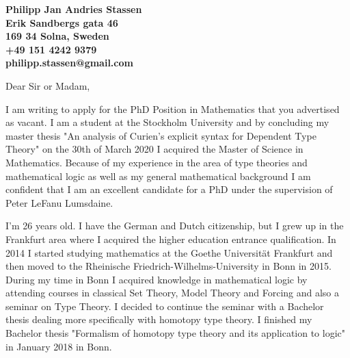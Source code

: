 \documentclass[11pt]{letter} %
\begin{document}

\begin{letter}

\begin{center}
\large\bf Philipp Jan Andries Stassen \\ %
Erik Sandbergs gata 46 \\ 169 34 Solna, Sweden \\ +49 151 4242 9379 \\ philipp.stassen@gmail.com %
\end{center} 
\vfill

\signature{Philipp Stassen} %


Dear Sir or Madam,

\smallskip

I am writing to apply for the PhD Position in Mathematics that you advertised as vacant.
I am a student at the Stockholm University and by concluding my master thesis "An analysis of Curien's explicit syntax for Dependent Type Theory" on the 30th of March 2020 I acquired the Master of Science in Mathematics. 
Because of my experience in the area of type theories and mathematical logic as well as my general mathematical background I am confident that I am an excellent candidate for a PhD under the supervision of Peter LeFanu Lumsdaine.

I'm 26 years old. I have the German and Dutch citizenship, but I grew up in the Frankfurt area where I acquired the higher education entrance qualification. In 2014 I started studying mathematics at the Goethe Universität Frankfurt and then moved to the Rheinische Friedrich-Wilhelms-University in Bonn in 2015. 
During my time in Bonn I acquired knowledge in mathematical logic by attending courses in classical Set Theory, Model Theory and Forcing and also a seminar on Type Theory. I decided to continue the seminar with a Bachelor thesis dealing more specifically with homotopy type theory.
I finished my Bachelor thesis "Formalism of homotopy type theory and its application to logic" in January 2018 in Bonn. 


\end{letter}
\end{document}
